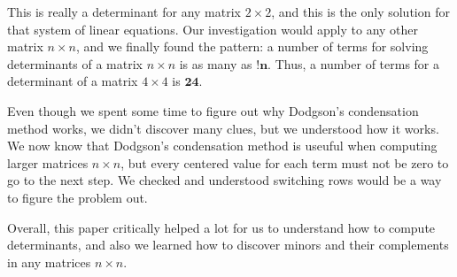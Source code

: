 \documentclass[12pt]{article}
\begin{document}
\noindent This is really a determinant for any matrix \(2 \times 2\), and this is the only solution
for that system of linear equations. Our investigation would apply to any other matrix \(n \times n\), and we finally found the pattern:
a number of terms for solving determinants of a matrix \(n \times n\) is as many as \(\mathbf{!n}\). Thus, a number of terms for a determinant of a matrix \(4 \times 4\) is \(\mathbf{24}\).

\bigskip

\noindent Even though we spent some time to figure out why Dodgson's condensation method works,
we didn't discover many clues, but we understood how it works. We now know that
Dodgson's condensation method is useuful when computing larger matrices \(n \times n\), but
every centered value for each term must not be zero to go to the next step. We checked and understood switching rows would be a way to
figure the problem out.

\bigskip

\noindent Overall, this paper critically helped a lot for us to understand how to compute determinants, and
also we learned how to discover minors and their complements in any matrices \(n \times n\).
\end{document}
